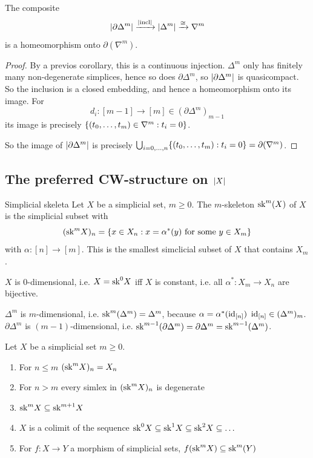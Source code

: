 \documentclass[language=english]{TemplateLecture}
\begin{document}
\begin{proposition}
    The composite
    \[\lvert\partial\Delta^m\rvert \xrightarrow{\lvert\operatorname{incl}\rvert} \lvert\Delta^m\rvert \xrightarrow{\cong} \nabla^m\]
    is a homeomorphism onto \(\partial(\nabla^m)\).
\end{proposition}

\begin{proof}
    By a previos corollary, this is a continuous injection. \(\Delta^m\) only has finitely many non-degenerate simplices, hence so does \(\partial\Delta^m\), so \(\lvert\partial\Delta^m\rvert\) is quasicompact. So the inclusion is a closed embedding, and hence a homeomorphism onto its image. For
    \[d_i\colon [m-1] \to [m]\in (\partial\Delta^m)_{m-1}\]
    its image is precisely \(\{(t_0, \dots, t_m)\in \nabla^m: t_i = 0\}\).

    So the image of \(\lvert\partial\Delta^m\rvert\) is precisely \(\bigcup_{i = 0, \dots, n} \{(t_0, \dots, t_m) : t_i = 0\} = \partial(\nabla^m)\).
\end{proof}

\subsection{The preferred CW-structure on \(\lvert X\rvert\)}

\begin{defi}{Simplicial skeleta}{}
    Let \(X\) be a simplicial set, \(m \geq 0\). The \(m\)-skeleton \(\mathrm{sk}^m(X)\) of \(X\) is the simplicial subset with
    \[(\mathrm{sk}^m X)_n = \{x\in X_n : x = \alpha^*(y) \text{ for some } y \in X_m\}\]
    with \(\alpha\colon [n] \to [m]\). This is the smallest simclicial subset of \(X\) that contains \(X_m\).
\end{defi}

\begin{example}
    \(X\) is \(0\)-dimensional, i.e. \(X = \mathrm{sk}^0 X\) iff \(X\) is constant, i.e. all \(\alpha^*\colon X_m \to X_n\) are bijective.

    \(\Delta^m\) is \(m\)-dimensional, i.e. \(\mathrm{sk}^m(\Delta^m) = \Delta^m\), because \(\alpha = \alpha^*(\operatorname{id}_{[n]})\) \(\operatorname{id}_{[n]}\in (\Delta^m)_m\).
    \(\partial\Delta^m\) is \((m-1)\)-dimensional, i.e. \(\mathrm{sk}^{m-1}(\partial\Delta^m) = \partial\Delta^m = \mathrm{sk}^{m-1}(\Delta^m)\).
\end{example}

\begin{proposition}
    Let \(X\) be a simplicial set \(m \geq 0\).
    \begin{enumerate}
        \item For \(n \leq m\) \((\mathrm{sk}^m X)_n = X_n\)
        \item For \(n > m\) every simlex in \((\mathrm{sk}^m X)_n\) is degenerate
        \item \(\mathrm{sk}^m X\subseteq \mathrm{sk}^{m+1} X\)
        \item \(X\) is a colimit of the sequence \(\mathrm{sk}^0 X\subseteq \mathrm{sk}^1 X \subseteq \mathrm{sk}^2 X\subseteq \dots\)
        \item For \(f\colon X \to Y\) a morphism of simplicial sets, \(f(\mathrm{sk}^m X) \subseteq \mathrm{sk}^m(Y)\)
    \end{enumerate}
\end{proposition}
\end{document}
